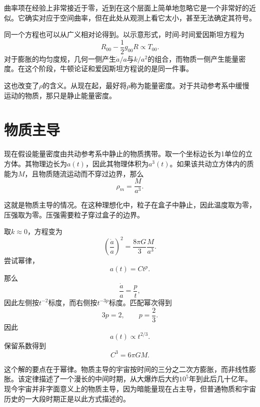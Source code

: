 曲率项在经验上非常接近于零，近到在这个层面上简单地忽略它是一个非常好的近似。它确实对应于空间曲率，但在此处从观测上看它太小，甚至无法确定其符号。

同一个方程也可以从广义相对论得到。以示意形式，时间-时间爱因斯坦方程为
\begin{equation}
R_{00}-\frac{1}{2}g_{00}R \propto T_{00}.
\end{equation}
对于膨胀的均匀度规，几何一侧产生\(\dot a/a\)与\(k/a^2\)的组合，而物质一侧产生能量密度。在这个阶段，牛顿论证和爱因斯坦方程说的是同一件事。

这也改变了\(\rho\)的含义。从现在起，最好将\(\rho\)称为能量密度。对于共动参考系中缓慢运动的物质，那只是静止能量密度。

\section{物质主导}

现在假设能量密度由共动参考系中静止的物质携带。取一个坐标边长为1单位的立方体。其物理边长为\(a(t)\)，因此其物理体积为\(a^3(t)\)。如果该共动立方体内的质能为\(M\)，且物质随流运动而不穿过边界，那么
\begin{equation}
\rho_m=\frac{M}{a^3}.
\end{equation}

这就是物质主导的情况。在这种理想化中，粒子在盒子中静止，因此温度取为零，压强取为零。压强需要粒子穿过盒子的边界。

取\(k\approx 0\)，方程变为
\begin{equation}
\left(\frac{\dot a}{a}\right)^2=\frac{8\pi G}{3}\frac{M}{a^3}.
\end{equation}
尝试幂律，
\begin{equation}
a(t)=Ct^p.
\end{equation}
那么
\begin{equation}
\frac{\dot a}{a}=\frac{p}{t},
\end{equation}
因此左侧按\(t^{-2}\)标度，而右侧按\(t^{-3p}\)标度。匹配幂次得到
\begin{equation}
3p=2,
\qquad
p=\frac{2}{3}.
\end{equation}
因此
\begin{equation}
a(t)\propto t^{2/3}.
\end{equation}
保留系数得到
\begin{equation}
C^3=6\pi G M.
\end{equation}

这个解的要点在于幂律。物质主导的宇宙按时间的三分之二次方膨胀，而非线性膨胀。该定律描述了一个漫长的中间时期，从大爆炸后大约\(10^5\)年到此后几十亿年。现今宇宙并非字面意义上的物质主导，因为暗能量现在占主导，但普通物质和宇宙历史的一大段时期正是以此方式描述的。

